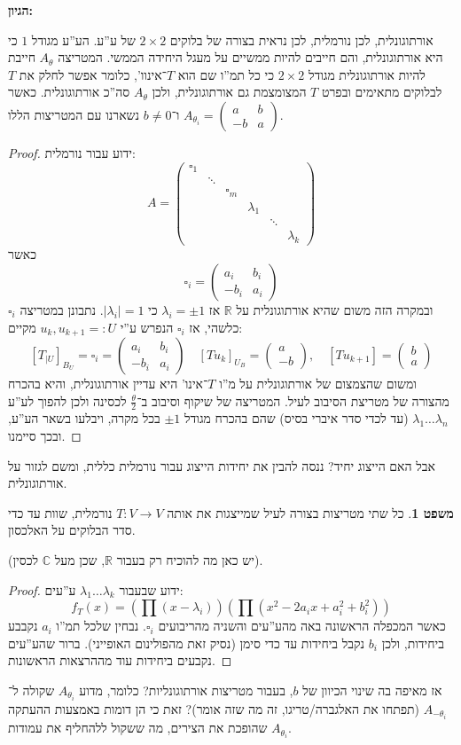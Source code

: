\documentclass[a4paper]{article}
\newcommand\R     {\mathbb{R}}
\newcommand\C     {\mathbb{C}}
\newcommand\ta    {\theta}
\newcommand\co        {\colon}
\newcommand\pms[1]    {\begin{pmatrix}
		#1
\end{pmatrix}}
\renewcommand\lg      {\lambda}
\newcommand\cl [1]    {\left ( #1 \right )}
\theoremstyle{definition}
\newtheorem{Theorem}{משפט}
\newcommand\theo  [1] {\begin{Theorem}#1\end{Theorem}}
\begin{document}
	\textbf{הגיון: }
	
	אורתוגונלית, לכן נורמלית, לכן נראית בצורה של בלוקים $2 \times 2$ של ע''ע. הע''ע מגודל $1$ כי היא אורתוגונלית, והם חייבים להיות ממשיים על מעגל היחידה הממשי. המטריצה $A_{\ta}$ חייבת להיות אורתוגונלית מגודל $2 \times 2$ כי כל תמ''ו שם הוא $T$־אינוו', כלומר אפשר לחלק את $T$ לבלוקים מתאימים ובפרט $T$ המצומצמת גם אורתוגונלית, ולכן $A_{\ta}$ סה''כ אורתוגונלית. כאשר $A_{\ta_i} = \pms{a & b \\ -b & a}$ ו־$b \neq 0$ נשארנו עם המטריצות הללו. 
	
	
	\begin{proof}
		ידוע עבור נורמלית: 
		\[ A = \pms{\square_1 \\ & \ddots \\ &&\square_m \\ &&& \lg_1 \\ &&&&\ddots \\ &&&&&\lg_k} \]
		כאשר
		\[ \square_i = \pms{a_i & b_i \\ -b_i & a_i} \]
		ובמקרה הזה משום שהיא אורתוגונלית על $\R$ אז $\lg_i = \pm1$ כי $|\lg_i| = 1$. נתבונן במטריצה $\square_i$ כלשהי, אז $\square_i$ הנפרש ע''י $u_k, u_{k + 1} =: U$ מקיים: 
		\[ [T_{|U}]_{B_U} = \square_i = \pms{a_i & b_i \\ -b_i & a_i}\quad [Tu_k]_{U_B} = \pms{a \\ -b}, \quad [Tu_{k + 1}] = \pms{b \\ a} \]
		ומשום שהצמצום של אורתוגונלית על מ''ו $T$־אינו' היא עדיין אורתוגונלית, והיא בהכרח מהצורה של מטריצת הסיבוב לעיל. המטריצה של שיקוף וסיבוב ב־$\frac{\ta}{2}$ לכסינה ולכן להפוך לע''ע $\lg_1 \dots \lg_n$ (עד לכדי סדר איברי בסיס) שהם בהכרח מגודל $\pm 1$ בכל מקרה, ויבלעו בשאר הע''ע, ובכך סיימנו. 
	\end{proof}
	
	אבל האם הייצוג יחיד? ננסה להבין את יחידות הייצוג עבור נורמלית כללית, ומשם לגזור על אורתוגונלית. 
	
	\theo{כל שתי מטריצות בצורה לעיל שמייצגות את אותה $T \co V \to V$ נורמלית, שוות עד כדי סדר הבלוקים על האלכסון. }
	
	(יש כאן מה להוכיח רק בעבור $\R$, שכן מעל $\C$ לכסין). 
	\begin{proof}
		ידוע שבעבור $\lg_1 \dots \lg_k$ ע''עים: 
		\[ f_T(x) = \cl{\prod (x - \lg_i)} \cl{\prod (x^2 - 2a_ix + a_i^2 + b_i^2)} \]
		כאשר המכפלה הראשונה באה מהע''עים והשניה מהריבועים $\square_i$. נבחין שלכל תמ''ו $a_i$ נקבבע ביחידות, ולכן $b_i$ נקבל ביחידות עד כדי סימן (נסיק זאת מהפולינום האופייני). ברור שהע''עים נקבעים ביחידות עוד מההרצאות הראשונות. 
	\end{proof}
	אז מאיפה בה שינוי הכיוון של $b$, בעבור מטריצות אורתוגונליות? כלומר, מדוע $A_{\ta_i}$ שקולה ל־$A_{-\ta_i}$ (תפתחו את האלגברה/טריגו, זה מה שזה אומר)? זאת כי הן דומות באמצעות ההעתקה שהופכת את הצירים, מה ששקול ללהחליף את עמודות $A_{\ta_i}$. 
	
\end{document}
